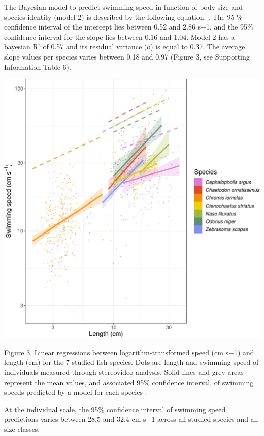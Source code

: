 \documentclass[12pt,a4paper]{article}
\makeatletter
\def\maxwidth{\ifdim\Gin@nat@width>\linewidth\linewidth
\else\Gin@nat@width\fi}
\let\Oldincludegraphics\includegraphics
\renewcommand{\includegraphics}[1]{\Oldincludegraphics[width=\maxwidth]{#1}}
\let\origfigure\figure
\let\endorigfigure\endfigure
\renewenvironment{figure}[1][2] {
    \expandafter\origfigure\expandafter[H]
} {
    \endorigfigure
}
\makeatother
\begin{document}
\noindent  The Bayesian model to predict swimming speed in function of
body size and species identity (model 2) is described by the following
equation: . The 95 \% confidence interval of the intercept lies between
0.52 and 2.86 s−1, and the 95\% confidence interval for the slope lies
between 0.16 and 1.04. Model 2 has a bayesian R² of 0.57 and its
residual variance (ơ) is equal to 0.37. The average slope values per
species varies between 0.18 and 0.97 (Figure 3, see Supporting
Information Table 6).

\begin{figure}
\centering
\includegraphics{main_text_files/figure-latex/unnamed-chunk-3-1.pdf}
\caption{testttt}
\end{figure}

Figure 3. Linear regressions between logarithm-transformed speed (cm
s−1) and length (cm) for the 7 studied fish species. Dots are length and
swimming speed of individuals measured through stereovideo analysis.
Solid lines and grey areas represent the mean values, and associated
95\% confidence interval, of swimming speeds predicted by a model for
each species .

At the individual scale, the 95\% confidence interval of swimming speed
predictions varies between 28.5 and 32.4 cm s−1 across all studied
species and all size classes.
\end{document}
